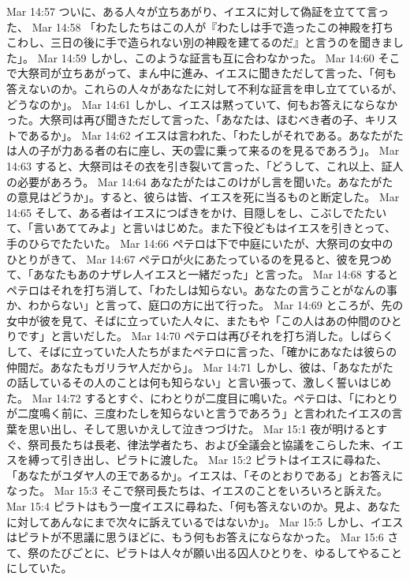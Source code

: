 Mar 14:57  ついに、ある人々が立ちあがり、イエスに対して偽証を立てて言った、
Mar 14:58  「わたしたちはこの人が『わたしは手で造ったこの神殿を打ちこわし、三日の後に手で造られない別の神殿を建てるのだ』と言うのを聞きました」。
Mar 14:59  しかし、このような証言も互に合わなかった。
Mar 14:60  そこで大祭司が立ちあがって、まん中に進み、イエスに聞きただして言った、「何も答えないのか。これらの人々があなたに対して不利な証言を申し立てているが、どうなのか」。
Mar 14:61  しかし、イエスは黙っていて、何もお答えにならなかった。大祭司は再び聞きただして言った、「あなたは、ほむべき者の子、キリストであるか」。
Mar 14:62  イエスは言われた、「わたしがそれである。あなたがたは人の子が力ある者の右に座し、天の雲に乗って来るのを見るであろう」。
Mar 14:63  すると、大祭司はその衣を引き裂いて言った、「どうして、これ以上、証人の必要があろう。
Mar 14:64  あなたがたはこのけがし言を聞いた。あなたがたの意見はどうか」。すると、彼らは皆、イエスを死に当るものと断定した。
Mar 14:65  そして、ある者はイエスにつばきをかけ、目隠しをし、こぶしでたたいて、「言いあててみよ」と言いはじめた。また下役どもはイエスを引きとって、手のひらでたたいた。
Mar 14:66  ペテロは下で中庭にいたが、大祭司の女中のひとりがきて、
Mar 14:67  ペテロが火にあたっているのを見ると、彼を見つめて、「あなたもあのナザレ人イエスと一緒だった」と言った。
Mar 14:68  するとペテロはそれを打ち消して、「わたしは知らない。あなたの言うことがなんの事か、わからない」と言って、庭口の方に出て行った。
Mar 14:69  ところが、先の女中が彼を見て、そばに立っていた人々に、またもや「この人はあの仲間のひとりです」と言いだした。
Mar 14:70  ペテロは再びそれを打ち消した。しばらくして、そばに立っていた人たちがまたペテロに言った、「確かにあなたは彼らの仲間だ。あなたもガリラヤ人だから」。
Mar 14:71  しかし、彼は、「あなたがたの話しているその人のことは何も知らない」と言い張って、激しく誓いはじめた。
Mar 14:72  するとすぐ、にわとりが二度目に鳴いた。ペテロは、「にわとりが二度鳴く前に、三度わたしを知らないと言うであろう」と言われたイエスの言葉を思い出し、そして思いかえして泣きつづけた。
Mar 15:1  夜が明けるとすぐ、祭司長たちは長老、律法学者たち、および全議会と協議をこらした末、イエスを縛って引き出し、ピラトに渡した。
Mar 15:2  ピラトはイエスに尋ねた、「あなたがユダヤ人の王であるか」。イエスは、「そのとおりである」とお答えになった。
Mar 15:3  そこで祭司長たちは、イエスのことをいろいろと訴えた。
Mar 15:4  ピラトはもう一度イエスに尋ねた、「何も答えないのか。見よ、あなたに対してあんなにまで次々に訴えているではないか」。
Mar 15:5  しかし、イエスはピラトが不思議に思うほどに、もう何もお答えにならなかった。
Mar 15:6  さて、祭のたびごとに、ピラトは人々が願い出る囚人ひとりを、ゆるしてやることにしていた。
